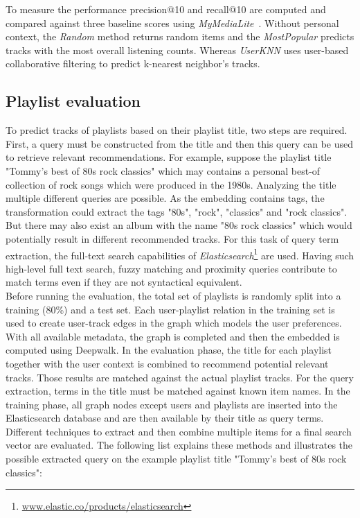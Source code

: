 \documentclass[sigconf]{acmart}
\begin{document}
To measure the performance precision@10 and recall@10 are computed and compared against three baseline scores using \emph{MyMediaLite}~\cite{Gantner2011MyMediaLite}. Without personal context, the \emph{Random} method returns random items and the \emph{MostPopular} predicts tracks with the most overall listening counts. Whereas \emph{UserKNN} uses user-based collaborative filtering to predict k-nearest neighbor’s tracks. 


\subsection{Playlist evaluation}
\label{subsec:playlist_eval}
To predict tracks of playlists based on their playlist title, two steps are required. First, a query must be constructed from the title and then this query can be used to retrieve relevant recommendations. For example, suppose the playlist title "Tommy's best of 80s rock classics" which may contains a personal best-of collection of rock songs which were produced in the 1980s. Analyzing the title multiple different queries are possible. As the embedding contains tags, the transformation could extract the tags "80s", "rock", "classics" and "rock classics". But there may also exist an album with the name "80s rock classics" which would potentially result in  different recommended tracks. For this task of query term extraction, the full-text search capabilities of \emph{Elasticsearch}\footnote{\url{www.elastic.co/products/elasticsearch}} are used. Having such high-level full text search, fuzzy matching and proximity queries contribute to match terms even if they are not syntactical equivalent.  \\

Before running the evaluation, the total set of playlists is randomly split into a training (80\%) and a test set. Each user-playlist relation in the training set is used to create user-track edges in the graph which models the user preferences. With all available metadata, the graph is completed and then the embedded is computed using Deepwalk. In the evaluation phase, the title for each playlist together with the user context is combined to recommend potential relevant tracks. Those results are matched against the actual playlist tracks. For the query extraction, terms in the title must be matched against known item names. In the training phase, all graph nodes except users and playlists are inserted into the Elasticsearch database and are then available by their title as query terms. Different techniques to extract and then combine multiple items for a final search vector are evaluated. The following list explains these methods and illustrates the possible extracted query on the example playlist title "Tommy's best of 80s rock classics":
\end{document}
